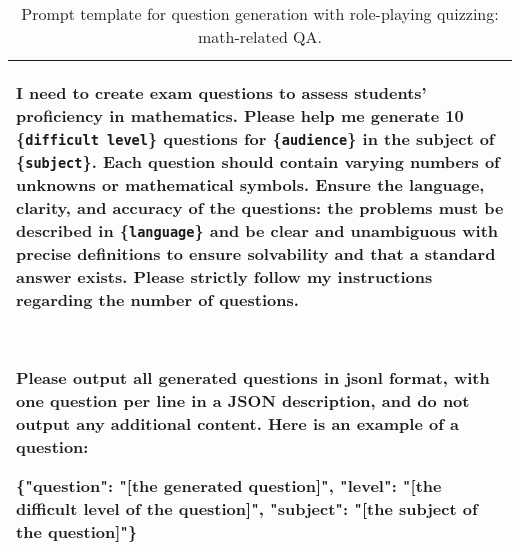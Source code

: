 





\begin{table*}[tbh!]
  \caption{Prompt template for question generation with role-playing quizzing: math-related QA.}
  \label{tab:prompt-rpq-math}
  \small
  \begin{tabularx}{\textwidth}{X}
    \toprule
        I need to create exam questions to assess students' proficiency in mathematics. Please help me generate 10 \{\texttt{difficult level}\} questions for \{\texttt{audience}\} in the subject of \{\texttt{subject}\}. Each question should contain varying numbers of unknowns or mathematical symbols. Ensure the language, clarity, and accuracy of the questions: the problems must be described in \{\texttt{language}\} and be clear and unambiguous with precise definitions to ensure solvability and that a standard answer exists. Please strictly follow my instructions regarding the number of questions.

        \ 
        
        Please output all generated questions in jsonl format, with one question per line in a JSON description, and do not output any additional content. Here is an example of a question:
        
        \{"question": "[the generated question]", "level": "[the difficult level of the question]", "subject": "[the subject of the question]"\}  \\
    \bottomrule
  \end{tabularx}
\end{table*}


